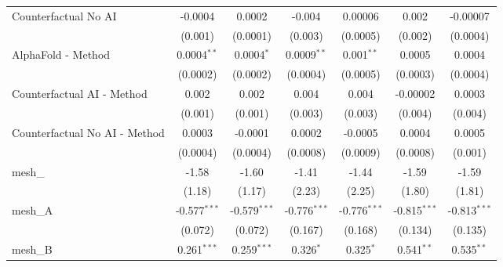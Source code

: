 \begin{tabular}{lcccccc}
   Counterfactual No AI                                        & -0.0004        & 0.0002         & -0.004         & 0.00006        & 0.002          & -0.00007\\   
                                                               & (0.001)        & (0.0001)       & (0.003)        & (0.0005)       & (0.002)        & (0.0004)\\   
   AlphaFold - Method                                          & 0.0004$^{**}$  & 0.0004$^{*}$   & 0.0009$^{**}$  & 0.001$^{**}$   & 0.0005         & 0.0004\\   
                                                               & (0.0002)       & (0.0002)       & (0.0004)       & (0.0005)       & (0.0003)       & (0.0004)\\   
   Counterfactual AI - Method                                  & 0.002          & 0.002          & 0.004          & 0.004          & -0.00002       & 0.0003\\   
                                                               & (0.001)        & (0.001)        & (0.003)        & (0.003)        & (0.004)        & (0.004)\\   
   Counterfactual No AI - Method                               & 0.0003         & -0.0001        & 0.0002         & -0.0005        & 0.0004         & 0.0005\\   
                                                               & (0.0004)       & (0.0004)       & (0.0008)       & (0.0009)       & (0.0008)       & (0.001)\\   
   mesh\_                                                      & -1.58          & -1.60          & -1.41          & -1.44          & -1.59          & -1.59\\   
                                                               & (1.18)         & (1.17)         & (2.23)         & (2.25)         & (1.80)         & (1.81)\\   
   mesh\_A                                                     & -0.577$^{***}$ & -0.579$^{***}$ & -0.776$^{***}$ & -0.776$^{***}$ & -0.815$^{***}$ & -0.813$^{***}$\\   
                                                               & (0.072)        & (0.072)        & (0.167)        & (0.168)        & (0.134)        & (0.135)\\   
   mesh\_B                                                     & 0.261$^{***}$  & 0.259$^{***}$  & 0.326$^{*}$    & 0.325$^{*}$    & 0.541$^{**}$   & 0.535$^{**}$\\   

\end{tabular}
